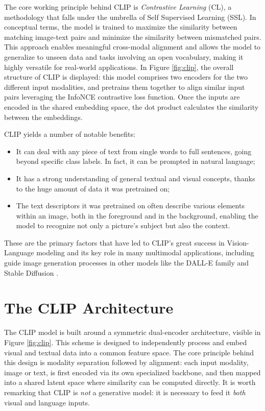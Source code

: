 \documentclass[a4paper, twoside, english]{sapthesis} %
\begin{document}
The core working principle behind CLIP is \emph{Contrastive Learning} (CL), a methodology that falls under the umbrella of Self Supervised Learning (SSL). In conceptual terms, the model is trained to maximize the similarity between matching image-text pairs and minimize the similarity between mismatched pairs. This approach enables meaningful cross-modal alignment and allows the model to generalize to unseen data and tasks involving an open vocabulary, making it highly versatile for real-world applications. In Figure \ref{fig:clip}, the overall structure of CLIP is displayed: this model comprises two encoders for the two different input modalities, and pretrains them together to align similar input pairs leveraging the InfoNCE contrastive loss function. Once the inputs are encoded in the shared embedding space, the dot product calculates the similarity between the embeddings.

CLIP yields a number of notable benefits:

\begin{itemize}
    \item It can deal with any piece of text from single words to full sentences, going beyond specific class labels. In fact, it can be prompted in natural language;
    \item It has a strong understanding of general textual and visual concepts, thanks to the huge amount of data it was pretrained on;
    \item The text descriptors it was pretrained on often describe various elements within an image, both in the foreground and in the background, enabling the model to recognize not only a picture's subject but also the context.
\end{itemize}

These are the primary factors that have led to CLIP's great success in Vision-Language modeling and its key role in many multimodal applications, including guide image generation processes in other models like the DALL-E family \cite{ramesh2022hierarchical} and Stable Diffusion \cite{rombach2022high}.


\section{The CLIP Architecture}

The CLIP model is built around a symmetric dual-encoder architecture, visible in Figure \ref{fig:clip}. This scheme is designed to independently process and embed visual and textual data into a common feature space. The core principle behind this design is modality separation followed by alignment: each input modality, image or text, is first encoded via its own specialized backbone, and then mapped into a shared latent space where similarity can be computed directly. It is worth remarking that CLIP is \textit{not} a generative model: it is necessary to feed it \textit{both} visual and language inputs.
\end{document}
